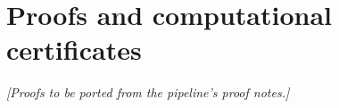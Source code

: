 \section{Proofs and computational certificates}\label{app:proofs}

%

\emph{[Proofs to be ported from the pipeline's proof notes.]}
